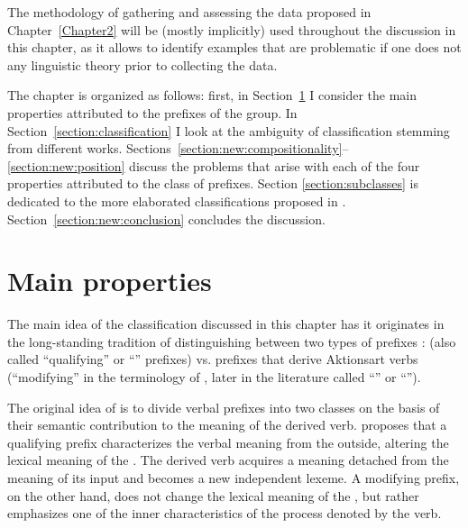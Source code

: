  The methodology of gathering and assessing the data proposed in Chapter~\ref{Chapter2} will be (mostly implicitly) used throughout the discussion in this chapter, as it allows to identify examples that are problematic if one does not  any linguistic theory prior to collecting the data.

The chapter is organized as follows: first, in Section~\ref{section:properties} I consider the main properties attributed to the prefixes of the  group. In Section~\ref{section:classification} I look at the ambiguity of classification stemming from different works. Sections~\ref{section:new:compositionality}--\ref{section:new:position} discuss the problems that arise with each of the four properties attributed to the class of  prefixes. Section \ref{section:subclasses} is dedicated to the more elaborated classifications proposed in \citet{Tatevosov:07,Tatevosov:09}. Section~\ref{section:new:conclusion} concludes the discussion.
\section{Main properties}\label{section:properties}
The main idea of the classification discussed in this chapter has it originates in the long-standing tradition of distinguishing between two types of prefixes \citep{Isachenko:60, Forsyth:70, Townsend:75}:  (also called ``qualifying'' or ``'' prefixes) vs. prefixes that derive Aktionsart verbs (``modifying'' in the terminology of \citeauthor{Isachenko:60}, later in the literature called ``'' or ``'').

The original idea of \citet[222--224]{Isachenko:60} is to divide verbal prefixes into two classes on the basis of their semantic contribution to the meaning of the derived verb. \citeauthor{Isachenko:60} proposes that a qualifying prefix characterizes the verbal meaning from the outside, altering the lexical meaning of the . The derived verb acquires a meaning detached from the meaning of its input and becomes a new independent lexeme. A modifying prefix, on the other hand, does not change the lexical meaning of the , but rather emphasizes one of the inner characteristics of the process denoted by the  verb.

